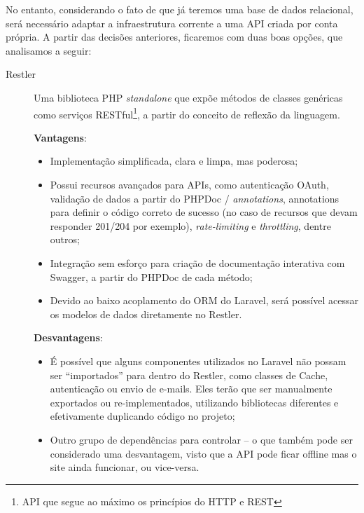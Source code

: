 \documentclass[12pt,a4paper,twoside,hyphens,english,brazil]{abntex2}
\begin{document}
{No entanto, considerando o fato de que já teremos uma base de dados relacional, será necessário adaptar a infraestrutura corrente a uma API criada por conta própria. A partir das decisões anteriores, ficaremos com duas boas opções, que analisamos a seguir:
\begin{description}
	\item[Restler]
		Uma biblioteca PHP \emph{standalone} que expõe métodos de classes genéricas como serviços RESTful\footnote{API que segue ao máximo os princípios do HTTP e REST}, a partir do conceito de reflexão da linguagem.
		
		\textbf{Vantagens}:
		\begin{itemize}[itemsep=-1ex]
			\item Implementação simplificada, clara e limpa, mas poderosa;
			\item Possui recursos avançados para APIs, como autenticação OAuth, validação de dados a partir do PHPDoc\footnotemark{} / \emph{annotations}, annotations para definir o código correto de sucesso (no caso de recursos que devam responder 201/204 por exemplo), \emph{rate-limiting} e \emph{throttling}, dentre outros;
			\item Integração sem esforço para criação de documentação interativa com Swagger\footnotemark{}, a partir do PHPDoc de cada método;
			\item Devido ao baixo acoplamento do ORM do Laravel, será possível acessar os modelos de dados diretamente no Restler.
		\end{itemize}
		
		\textbf{Desvantagens}:
		\begin{itemize}[itemsep=-1ex]
			\item É possível que alguns componentes utilizados no Laravel não possam ser ``importados'' para dentro do Restler, como classes de Cache, autenticação ou envio de e-mails. Eles terão que ser manualmente exportados ou re-implementados, utilizando bibliotecas diferentes e efetivamente duplicando código no projeto;
			\item Outro grupo de dependências para controlar -- o que também pode ser considerado uma desvantagem, visto que a API pode ficar offline mas o site ainda funcionar, ou vice-versa.
		\end{itemize}
	

\end{description}}
\end{document}
